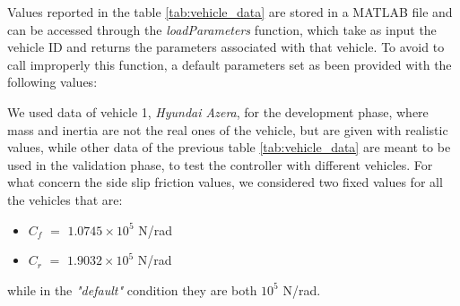 \begin{table}[H]
\caption{Vehicle data considered for development and validation}
\label{tab:vehicle_data}
\end{table}
Values reported in the table \ref{tab:vehicle_data} are stored in a MATLAB file and can be accessed through the \textit{loadParameters} function, which take as input the vehicle ID and returns the parameters associated with that vehicle. To avoid to call improperly this function, a default parameters set as been provided with the following values:
\begin{table}[H]
\end{table}
We used data of vehicle 1, \textit{Hyundai Azera}, for the development phase, where mass and inertia are not the real ones of the vehicle, but are given with realistic values, while other data of the previous table \ref{tab:vehicle_data} are meant to be used in the validation phase, to test the controller with different vehicles.
For what concern the side slip friction values, we considered two fixed values for all the vehicles that are:
\begin{itemize}
    \item $C_f$ $=$ $1.0745\times10^5$ N/rad
    \item $C_r$ $=$ $1.9032\times10^5$ N/rad
\end{itemize}
while in the \textit{"default"} condition they are both $10^5$ N/rad.

